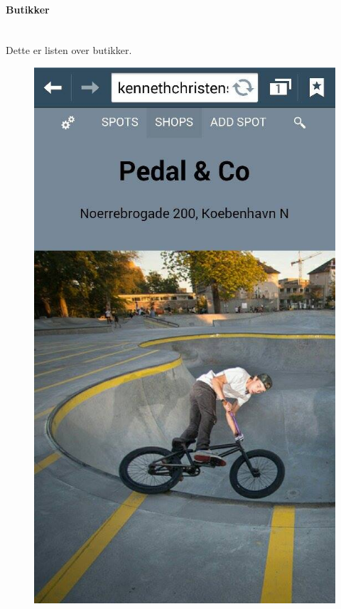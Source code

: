 \documentclass[12pt]{article}
\begin{document}
\newpage
\paragraph{Butikker}\mbox{}\\
Dette er listen over butikker.\\
\begin{figure}[h]
\includegraphics[scale = 0.3]{shops}
\end{figure}

\newpage
\end{document}

